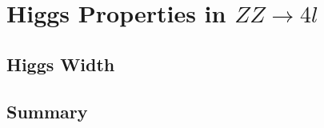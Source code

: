\chapter{Higgs Properties in $ZZ\rightarrow4l$}
\label{sec:properties}

\section{Higgs Width}
\label{sec:Width}

\section{Summary}
\label{sec:properties_summary}